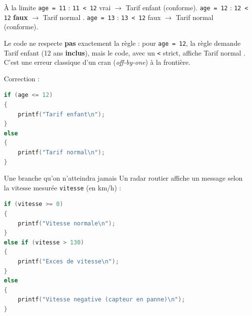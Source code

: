 \begin{UPSTIprofOnlyEnv}
    \begin{UPSTIcorrectionP}{À la limite}
        \texttt{age = 11} : \texttt{11 < 12} vrai $\to$ \og Tarif enfant \fg{} (conforme).
        \texttt{age = 12} : \texttt{12 < 12} \textbf{faux} $\to$ \og Tarif normal \fg.
        \texttt{age = 13} : \texttt{13 < 12} faux $\to$ \og Tarif normal \fg{} (conforme).

        Le code ne respecte \textbf{pas} exactement la règle : pour \texttt{age = 12}, la règle demande \og Tarif enfant \fg{} (12 ans \textbf{inclus}), mais le code, avec un \texttt{<} strict, affiche \og Tarif normal \fg. C'est une erreur classique \og d'un cran \fg{} (\emph{off-by-one}) à la frontière.

        Correction :
        \begin{lstlisting}[language=C]
if (age <= 12)
{
    printf("Tarif enfant\n");
}
else
{
    printf("Tarif normal\n");
}
        \end{lstlisting}
    \end{UPSTIcorrectionP}
\end{UPSTIprofOnlyEnv}


\begin{UPSTIexercice}{Une branche qu'on n'atteindra jamais}
    Un radar routier affiche un message selon la vitesse mesurée \texttt{vitesse} (en km/h) :
    \begin{lstlisting}[language=C]
if (vitesse >= 0)
{
    printf("Vitesse normale\n");
}
else if (vitesse > 130)
{
    printf("Exces de vitesse\n");
}
else
{
    printf("Vitesse negative (capteur en panne)\n");
}
    \end{lstlisting}
\end{UPSTIexercice}

